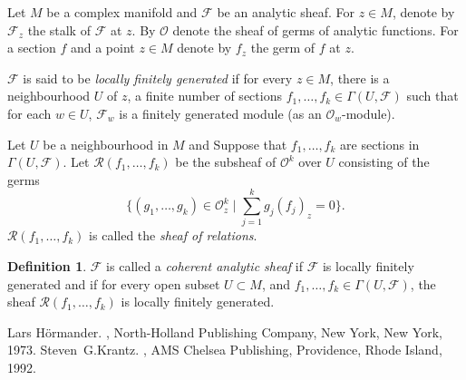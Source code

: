 \documentclass[12pt]{article}
\theoremstyle{theorem}
\theoremstyle{definition}
\newtheorem*{defn}{Definition}
\theoremstyle{remark}
\begin{document}
Let $M$ be a complex manifold and $\mathcal{F}$ be an analytic sheaf.
For $z \in M$, denote by $\mathcal{F}_z$ the stalk of $\mathcal{F}$ at $z$.
By $\mathcal{O}$ denote the sheaf of germs of analytic functions.  For a section
$f$ and a point $z \in M$ denote by $f_z$ the germ of $f$ at $z$.

$\mathcal{F}$ is said to be \emph{locally finitely generated} if for every $z \in M$,
there is a neighbourhood $U$ of $z$, a finite number of sections
$f_1,\ldots,f_k \in \Gamma(U,\mathcal{F})$ such that for each $w \in U$,
$\mathcal{F}_w$ is a finitely generated module (as an $\mathcal{O}_w$-module).

Let $U$ be a neighbourhood in $M$ and
Suppose that $f_1,\ldots,f_k$ are sections in $\Gamma(U,\mathcal{F})$.
Let $\mathcal{R}(f_1,\ldots,f_k)$ be the subsheaf of ${\mathcal{O}}^k$
over $U$ consisting of the germs
\begin{equation*}
\{ (g_1,\ldots,g_k) \in {\mathcal{O}}^k_z \mid
   \sum_{j=1}^k g_j (f_j)_z = 0 \} .
\end{equation*}
$\mathcal{R}(f_1,\ldots,f_k)$ is called the \emph{sheaf of relations}.

\begin{defn}
$\mathcal{F}$ is called a \emph{coherent analytic sheaf} if $\mathcal{F}$
is locally finitely generated and if for every open subset $U \subset M$,
and $f_1,\ldots,f_k \in \Gamma(U,\mathcal{F})$,
the
sheaf $\mathcal{R}(f_1,\ldots,f_k)$ is locally finitely generated.
\end{defn}

\begin{thebibliography}{9}
Lars H\"ormander.
{\em {}},
North-Holland Publishing Company, New York, New York, 1973.
Steven~G.\@ Krantz.
{\em {}},
AMS Chelsea Publishing, Providence, Rhode Island, 1992.
\end{thebibliography}
\end{document}
